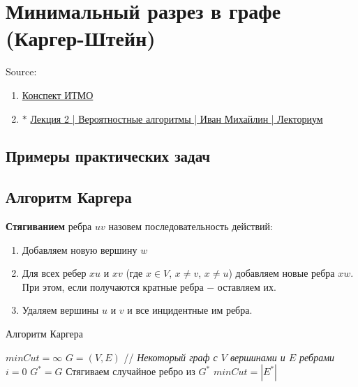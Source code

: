     
\newpage
\section{Минимальный разрез в графе (Каргер-Штейн)}
    Source:
    \begin{enumerate}
        \item \href{https://neerc.ifmo.ru/wiki/index.php?title=Алгоритм_Каргера_для_нахождения_минимального_разреза}{Конспект ИТМО}
        \item $\ast$ \href{https://www.youtube.com/watch?v=ogodh2PQFug&t=23s}{Лекция 2 | Вероятностные алгоритмы | Иван Михайлин | Лекториум}
    \end{enumerate}

    \subsection{Примеры практических задач}
        
        
    \subsection{Алгоритм Каргера}
        \begin{definition}
            \textbf{Стягиванием} ребра $uv$ назовем последовательность действий:
            \begin{enumerate}
                \item Добавляем новую вершину $w$
                \item Для всех ребер $xu$ и $xv$ (где $x \in V$, $x \neq v$, $x \neq u$) добавляем новые ребра $xw$. При этом, если получаются кратные ребра $-$ оставляем их.
                \item Удаляем вершины $u$ и $v$ и все инцидентные им ребра.\\ 
            \end{enumerate}
        \end{definition}
        
        \begin{algorithm}
            \caption{Алгоритм Каргера}
            \begin{algorithmic}
                \STATE $minCut = \infty$
                \STATE $G = (V, E)$ // \textit{Некоторый граф с $V$ вершинами и $E$ ребрами}
                \STATE $i = 0$
                    \STATE $G^* = G$
                        \STATE Стягиваем случайное ребро из $G^*$
                    \ENDWHILE
                        \STATE $minCut = |E^*|$
                    \ENDIF
                 \ENDFOR
            \end{algorithmic}
        \end{algorithm}\\

